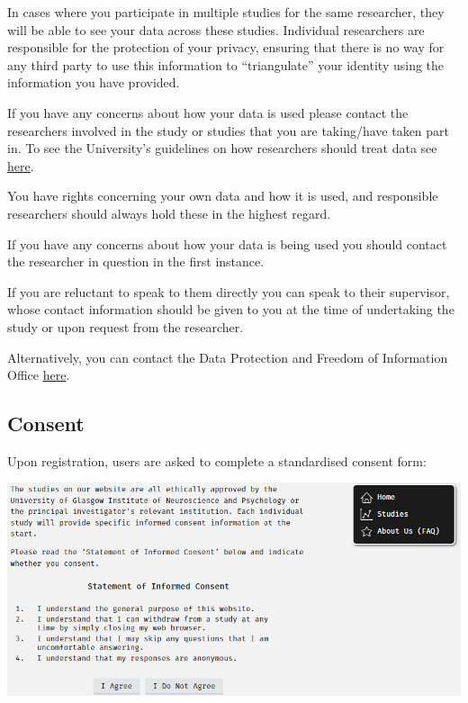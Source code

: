 \documentclass[]{book}
\begin{document}
In cases where you participate in multiple studies for the same researcher, they will be able to see your data across these studies. Individual researchers are responsible for the protection of your privacy, ensuring that there is no way for any third party to use this information to ``triangulate'' your identity using the information you have provided.

If you have any concerns about how your data is used please contact the researchers involved in the study or studies that you are taking/have taken part in. To see the University's guidelines on how researchers should treat data see \href{https://www.gla.ac.uk/myglasgow/dpfoioffice/}{here}.

\begin{warning}
You have rights concerning your own data and how it is used, and
responsible researchers should always hold these in the highest regard.

If you have any concerns about how your data is being used you should
contact the researcher in question in the first instance.

If you are reluctant to speak to them directly you can speak to their
supervisor, whose contact information should be given to you at the time
of undertaking the study or upon request from the researcher.

Alternatively, you can contact the Data Protection and Freedom of
Information Office
\href{https://www.gla.ac.uk/myglasgow/dpfoioffice/contact/}{here}.
\end{warning}

\hypertarget{consent}{%
\subsection*{Consent}\label{consent}}

Upon registration, users are asked to complete a standardised consent form:

\includegraphics{images/screenshots/consent.png}
\end{document}
